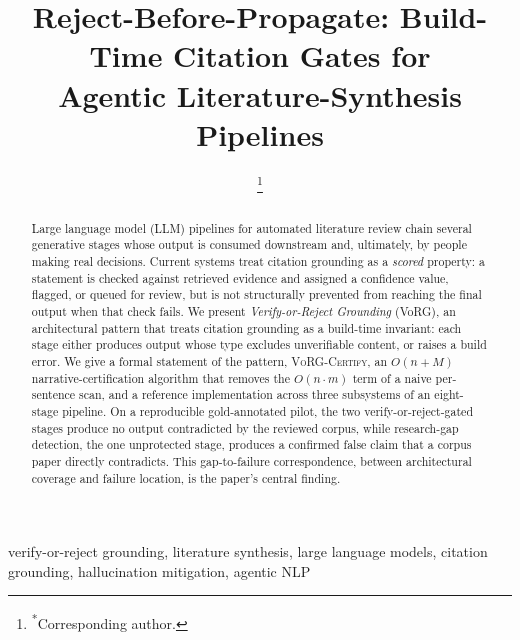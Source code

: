 \documentclass[conference]{IEEEtran}
\begin{document}
\title{Reject-Before-Propagate: Build-Time Citation Gates for\\ Agentic Literature-Synthesis Pipelines}

\author{
\thanks{\textsuperscript{*}Corresponding author.}}

\maketitle

\begin{abstract}
Large language model (LLM) pipelines for automated literature review chain
several generative stages whose output is consumed downstream and, ultimately,
by people making real decisions. Current systems treat citation grounding as a
\emph{scored} property: a statement is checked against retrieved evidence and
assigned a confidence value, flagged, or queued for review, but is not
structurally prevented from reaching the final output when that check fails. We
present \emph{Verify-or-Reject Grounding} (VoRG), an architectural pattern that
treats citation grounding as a build-time invariant: each stage either produces
output whose type excludes unverifiable content, or raises a build error. We give
a formal statement of the pattern, \textsc{VoRG-Certify}, an $O(n{+}M)$
narrative-certification algorithm that removes the $O(n{\cdot}m)$ term of a naive
per-sentence scan, and a reference implementation across three subsystems of an
eight-stage pipeline. On a reproducible gold-annotated pilot, the two
verify-or-reject-gated stages produce no output contradicted by the reviewed
corpus, while research-gap detection, the one unprotected stage, produces a
confirmed false claim that a corpus paper directly contradicts. This
gap-to-failure correspondence, between architectural coverage and failure
location, is the paper's central finding.
\end{abstract}

\begin{IEEEkeywords}
verify-or-reject grounding, literature synthesis, large language models, citation
grounding, hallucination mitigation, agentic NLP
\end{IEEEkeywords}
\end{document}
